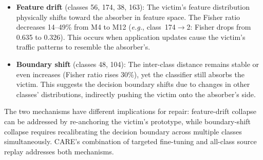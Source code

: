 \documentclass[journal]{IEEEtran}
\newcommand{\ours}{CARE}  %
\newcommand{\eg}{\textit{e.g.}}
\begin{document}
\begin{itemize}
  \item \textbf{Feature drift} (classes 56, 174, 38, 163): The victim's feature distribution physically shifts toward the absorber in feature space. The Fisher ratio decreases 14--49\% from M4 to M12 (\eg{}, class~174$\to$2: Fisher drops from 0.635 to 0.326). This occurs when application updates cause the victim's traffic patterns to resemble the absorber's.
  \item \textbf{Boundary shift} (classes 48, 104): The inter-class distance remains stable or even increases (Fisher ratio rises 30\%), yet the classifier still absorbs the victim. This suggests the decision boundary shifts due to changes in other classes' distributions, indirectly pushing the victim onto the absorber's side.
\end{itemize}

The two mechanisms have different implications for repair: feature-drift collapse can be addressed by re-anchoring the victim's prototype, while boundary-shift collapse requires recalibrating the decision boundary across multiple classes simultaneously. \ours{}'s combination of targeted fine-tuning and all-class source replay addresses both mechanisms.
\end{document}
